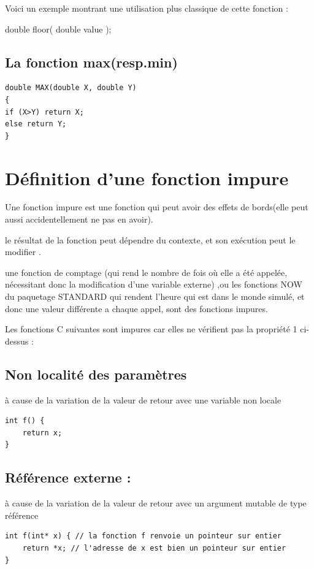\documentclass[12pt,titlepage]{article}
\begin{document}
Voici un exemple montrant une utilisation plus classique de cette fonction :

double      floor( double value );


\subsection{La fonction max(resp.min)}

\begin{lstlisting}
double MAX(double X, double Y)
{
if (X>Y) return X;
else return Y;
}
\end{lstlisting}

\section{Définition d’une fonction impure}

Une fonction impure est une fonction qui peut avoir des effets de bords(elle peut aussi accidentellement ne pas en avoir).

le résultat de la fonction peut dépendre du contexte, et son exécution peut le modifier .

une fonction de comptage (qui rend le nombre de fois où elle a été appelée, nécessitant donc la modification d’une variable externe) ,ou les fonctions NOW du paquetage STANDARD qui rendent l’heure qui est dans le monde simulé, et donc une valeur différente a chaque appel, sont des  fonctions impures.

Les fonctions C suivantes sont impures car elles ne vérifient pas la propriété 1 ci-dessus :

\subsection{Non localité des paramètres}

à cause de la variation de la valeur de retour avec une variable non locale

\begin{lstlisting}
int f() {
    return x;
}
\end{lstlisting}

\subsection{Référence externe :}

à cause de la variation de la valeur de retour avec un argument mutable de type référence

\begin{lstlisting}
int f(int* x) { // la fonction f renvoie un pointeur sur entier
    return *x; // l'adresse de x est bien un pointeur sur entier
}
\end{lstlisting}
\end{document}
